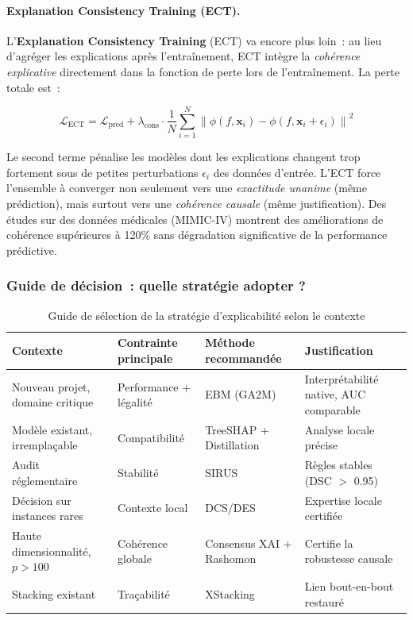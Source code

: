 \paragraph{Explanation Consistency Training (ECT).}

L'\textbf{Explanation Consistency Training} (ECT) va encore plus loin~: au lieu d'agréger
les explications après l'entraînement, ECT intègre la \textit{cohérence explicative} directement
dans la fonction de perte lors de l'entraînement. La perte totale est~:

\begin{equation}
  \mathcal{L}_{\text{ECT}} = \mathcal{L}_{\text{pred}} + \lambda_{\text{cons}} \cdot
  \frac{1}{N}\sum_{i=1}^{N} \left\|\phi(f, \mathbf{x}_i) - \phi(f, \mathbf{x}_i + \epsilon_i)\right\|^2
  \label{eq:ect}
\end{equation}

Le second terme pénalise les modèles dont les explications changent trop fortement sous
de petites perturbations $\epsilon_i$ des données d'entrée. L'ECT force l'ensemble à
converger non seulement vers une \textit{exactitude unanime} (même prédiction), mais
surtout vers une \textit{cohérence causale} (même justification). Des études sur des
données médicales (MIMIC-IV) montrent des améliorations de cohérence supérieures à
120\% sans dégradation significative de la performance prédictive.

\subsubsection{Guide de décision~: quelle stratégie adopter ?}

\begin{table}[H]
\centering
\caption{Guide de sélection de la stratégie d'explicabilité selon le contexte}
\renewcommand{\arraystretch}{1.6}
\begin{tabular}{p{3.5cm} p{2.5cm} p{2.5cm} p{3.5cm}}
\toprule
\textbf{Contexte} & \textbf{Contrainte principale} & \textbf{Méthode recommandée} & \textbf{Justification} \\
\midrule
Nouveau projet, domaine critique & Performance + légalité & EBM (GA2M) & Interprétabilité native, AUC comparable \\
Modèle existant, irremplaçable & Compatibilité & TreeSHAP + Distillation & Analyse locale précise \\
Audit réglementaire & Stabilité & SIRUS & Règles stables (DSC $>$ 0.95) \\
Décision sur instances rares & Contexte local & DCS/DES & Expertise locale certifiée \\
Haute dimensionnalité, $p > 100$ & Cohérence globale & Consensus XAI + Rashomon & Certifie la robustesse causale \\
Stacking existant & Traçabilité & XStacking & Lien bout-en-bout restauré \\
\bottomrule
\end{tabular}
\label{tab:guide_decision}
\end{table}

